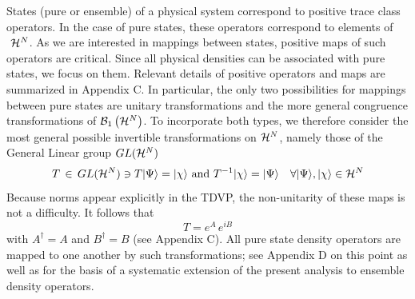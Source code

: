 States (pure or ensemble) of a physical system correspond to positive trace
class operators. In the case of pure states, these operators correspond to
elements of $\ {\cal H}^{N}$. As we are interested in mappings between
states, positive maps of such operators are critical. Since all physical
densities can be associated with pure states, we focus on them. Relevant
details of positive operators and maps are summarized in Appendix C. In
particular, the only two possibilities for mappings between pure states are
unitary transformations and the more general congruence transformations\cite%
{congruence} of ${\cal B}_{1}\left( {\cal H}^{N}\right) $. To incorporate
both types, we therefore consider the most general possible invertible
transformations on ${\cal H}^{N}$, namely those of the General Linear group $%
GL({\cal H}^{N})$ 
\begin{equation}
T\,\in \,GL({\cal H}^{N})\ni T|\Psi \rangle =|\chi \rangle \text{ and }%
T^{-1}|\chi \rangle =|\Psi \rangle \quad \forall |\Psi \rangle ,|\chi
\rangle \in {\cal H}^{N}
\end{equation}%
Because norms appear explicitly in the TDVP, the non-unitarity of these maps
is not a difficulty. It follows that 
\begin{equation}
T=e^{A}\,e^{iB}  \label{eAeiB}
\end{equation}%
with $A^{\dagger }=A$ and $B^{\dagger }=B$ (see Appendix C). All pure state
density operators are mapped to one another by such transformations; see
Appendix D on this point as well as for the basis of a systematic extension
of the present analysis to ensemble density operators.

